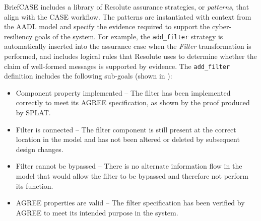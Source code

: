 BriefCASE includes a library of Resolute assurance strategies, or \emph{patterns}, that align with
the CASE workflow. The patterns are instantiated with context from the AADL model and specify the
evidence required to support the cyber-resiliency goals of the system. For example, the
\texttt{add\_filter} strategy is automatically inserted into the assurance case when the
\textit{Filter} transformation is performed, and includes logical rules that Resolute uses to
determine whether the claim of well-formed messages is supported by evidence. The \texttt{add\_filter}
definition includes the following sub-goals (shown in ):
\begin{itemize} 
\item Component property implemented -- The filter has been implemented correctly 
to meet its AGREE specification, as shown by the proof produced by SPLAT.
\item Filter is connected -- The filter component is still present at the correct location in the model and has not been 
altered or deleted by subsequent design changes. 
\item Filter cannot be bypassed -- There is no alternate information flow in the model that 
would allow the filter to be bypassed and therefore not perform its function.   
\item AGREE properties are valid -- The filter specification has been verified by AGREE to meet its
intended purpose in the system.   
\end{itemize}







